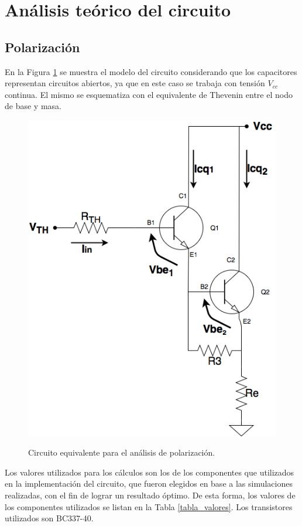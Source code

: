
\section{Análisis teórico del circuito}



	\subsection{Polarizaci\'on}
		En la Figura \ref{polarizacion} se muestra el modelo del circuito considerando que los capacitores representan circuitos abiertos, ya que en este caso se trabaja con tensión $V_{cc}$ continua. El mismo se esquematiza con el equivalente de Thevenin entre el nodo de base y masa.\\
		\begin{figure}[H]
			\centering
			\includegraphics[scale=0.4]{./Imagenes/polarizacion.png} \\
			\caption{Circuito equivalente para el an\'alisis de polarizaci\'on.}
			\label{polarizacion}
		\end{figure}

Los valores utilizados para los cálculos son los de los componentes que utilizados en la implementación del circuito, que fueron elegidos en base a las simulaciones realizadas, con el fin de lograr un resultado óptimo. De esta forma, los valores de los componentes utilizados se listan en la Tabla \ref{tabla_valores}. Los transistores utilizados son BC337-40.

